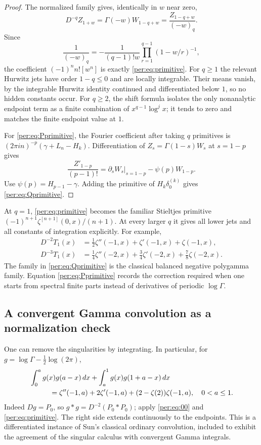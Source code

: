 \begin{proof}
The normalized family gives, identically in $w$ near zero,
\begin{equation}\label{per:eq:primitivegenerator}
 D^{-q}Z_{1+w}
 =\Gamma(-w)W_{1-q+w}
 =\frac{Z_{1-q+w}}{(-w)_q}.
\end{equation}
Since
\[
 \frac1{(-w)_q}
 =-\frac1{(q-1)!w}\prod_{r=1}^{q-1}(1-w/r)^{-1},
\]
the coefficient $(-1)^nn![w^n]$ is exactly
\eqref{per:eq:primitive}. For $q\ge1$ the relevant Hurwitz jets have
order $1-q\le0$ and are locally integrable. Their means vanish, by the
integrable Hurwitz identity continued and differentiated below $1$,
so no hidden constants occur. For $q\ge2$, the shift formula isolates
the only nonanalytic endpoint term as a finite combination of
$x^{q-1}\log^j x$; it tends to zero and matches the finite endpoint
value at $1$.

For \eqref{per:eq:Pprimitive}, the Fourier coefficient after taking
$q$ primitives is $(2\pi i n)^{-p}(\gamma+L_n-H_k)$.
Differentiation of $Z_s=\Gamma(1-s)W_s$ at $s=1-p$ gives
\[
 \frac{Z'_{1-p}}{(p-1)!}
 =\partial_sW_s\big|_{s=1-p}-\psi(p)W_{1-p}.
\]
Use $\psi(p)=H_{p-1}-\gamma$. Adding the primitive of
$H_k\delta_0^{(k)}$ gives \eqref{per:eq:Qprimitive}.
\end{proof}

At $q=1$, \eqref{per:eq:primitive} becomes the familiar Stieltjes
primitive $(-1)^{n+1}\zeta^{[n+1]}(0,x)/(n+1)$. At every larger $q$
it gives all lower jets and all constants of integration explicitly.
For example,
\begin{align*}
 D^{-2}T_1(x)&=\tfrac12\zeta''(-1,x)+\zeta'(-1,x)+\zeta(-1,x),\\
 D^{-3}T_1(x)&=\tfrac14\zeta''(-2,x)+\tfrac34\zeta'(-2,x)
                                      +\tfrac78\zeta(-2,x).
\end{align*}
The family in \eqref{per:eq:Qprimitive} is the classical balanced
negative polygamma family. Equation \eqref{per:eq:Pprimitive} records
the correction required when one starts from spectral finite parts
instead of derivatives of periodic $\log\Gamma$.


\subsection{A convergent Gamma convolution as a normalization check}

One can remove the singularities by integrating. In particular, for
$g=\log\Gamma-\tfrac12\log(2\pi)$,
\begin{align}
 &\int_0^a g(x)g(a-x)\,dx
       +\int_a^1g(x)g(1+a-x)\,dx\notag\\
 &\hspace{10mm}=\zeta''(-1,a)+2\zeta'(-1,a)
                           +(2-\zeta(2))\zeta(-1,a),\quad 0<a\le1.
 \label{per:eq:gammaordinary}
\end{align}
Indeed $Dg=P_0$, so $g*g=D^{-2}(P_0*P_0)$; apply
\eqref{per:eq:00} and \eqref{per:eq:primitive}. The right side extends
continuously to the endpoints. This is a differentiated instance of
Sun's classical ordinary convolution, included to exhibit the agreement
of the singular calculus with convergent Gamma integrals.
